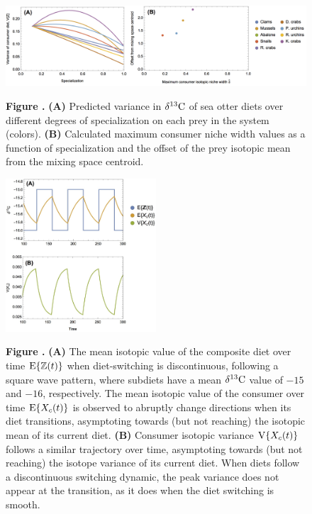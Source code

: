 \documentclass{article}
\begin{document}
\begin{figure}[h!]
\begin{center}
\includegraphics[width=1\textwidth]{fig_ottervar.jpg}
\end{center}
\textbf{\label{figottervar} Figure .}{
{\bf(A)} Predicted variance in $\delta^{13}{\rm C}$ of sea otter diets over different degrees of specialization on each prey in the system (colors).
{\bf(B)} Calculated maximum consumer niche width values as a function of specialization and the offset of the prey isotopic mean from the mixing space centroid.
}
\end{figure}



\begin{figure}[h!]
\begin{center}
\includegraphics[width=0.5\textwidth]{fig_sawtooth.jpg}
\end{center}
\textbf{\label{figsawtooth} Figure .}{
{\bf(A)} The mean isotopic value of the composite diet over time ${\rm E}\{\mathbb{Z}(t)\}$ when diet-switching is discontinuous, following a square wave pattern, where subdiets have a mean $\delta^{13}{\rm C}$ value of $-15$ and $-16$, respectively.
The mean isotopic value of the consumer over time ${\rm E}\{X_c(t)\}$ is observed to abruptly change directions when its diet transitions, asymptoting towards (but not reaching) the isotopic mean of its current diet.
{\bf(B)} Consumer isotopic variance ${\rm V}\{X_c(t)\}$ follows a similar trajectory over time, asymptoting towards (but not reaching) the isotope variance of its current diet.
When diets follow a discontinuous switching dynamic, the peak variance does not appear at the transition, as it does when the diet switching is smooth.
}
\end{figure}
\end{document}
